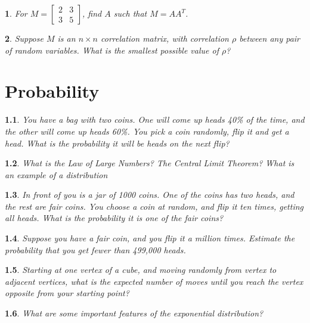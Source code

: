\documentclass{report}
\newtheorem{problem}{}
\numberwithin{problem}{chapter} %
\begin{document}
\begin{problem}
For $M =\begin{bmatrix}
    2  & 3 \\
    3  & 5
\end{bmatrix}$, find $A$ such that $M=AA^{T}$.
\end{problem}

\begin{problem}
Suppose $M$ is an $n\times n$ correlation matrix, with correlation $\rho$ between any pair of random variables. What is the smallest possible value of $\rho$?
\end{problem}

\chapter{Probability}

\begin{problem}
You have a bag with two coins. One will come up heads 40\% of the time, and the other will come up heads 60\%. You pick a coin randomly, flip it and get a head. What is the probability it will be heads on the next flip?
\end{problem}

\begin{problem}
What is the Law of Large Numbers? The Central Limit Theorem? What is an example of a distribution 
\end{problem}

\begin{problem}
In front of you is a jar of 1000 coins. One of the coins has two heads, and the rest are fair coins. You choose a coin at random, and flip it ten times, getting all heads. What is the probability it is one of the fair coins?
\end{problem}

\begin{problem}
Suppose you have a fair coin, and you flip it a million times. Estimate the probability that you get fewer than 499,000 heads.
\end{problem}

\begin{problem}
\cite{STRAWA}
Starting at one vertex of a cube, and moving randomly from vertex to adjacent vertices, what is the expected number of moves until you reach the  vertex opposite from your starting point?
\end{problem}

\begin{problem}
What are some important features of the exponential distribution?
\end{problem}
\end{document}
